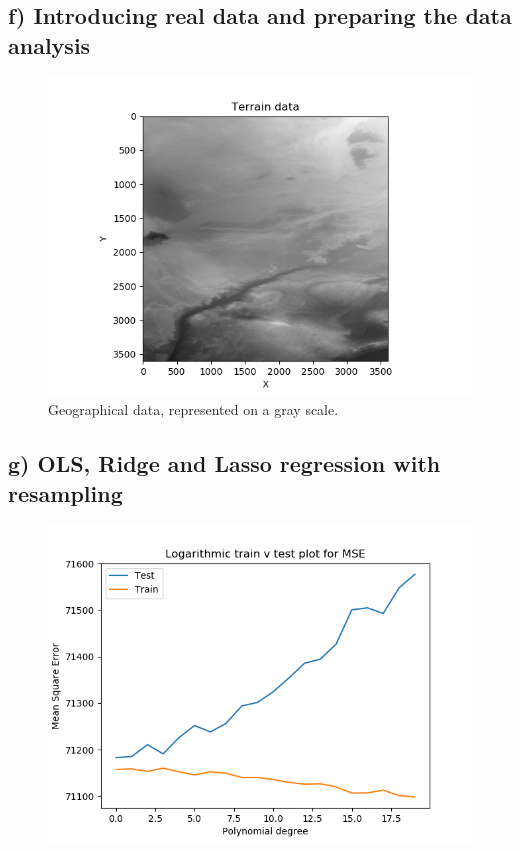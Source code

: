 \documentclass[a4paper, UKenglish]{article}
\newcommand{\0}{\mathbf{0}}
\newcommand{\1}{\mathbf{1}}
\begin{document}
\subsection{f) Introducing real data and preparing the data analysis}
\begin{figure}[H]
        \centering 
        \includegraphics[scale=0.75]{../Source_code/geodata/geodata_area.png} 
        \caption{Geographical data, represented on a gray scale.}
        \label{fig:geodata}
\end{figure}

\subsection{g) OLS, Ridge and Lasso regression with resampling}

\begin{figure}[H]
        \centering 
        \includegraphics[scale=0.75]{../outputs/images/partG/trainTestMSE.png} 
        \caption{}
        \label{fig:geodata}
\end{figure}
\end{document}
